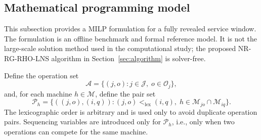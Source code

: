 \documentclass[a4paper,fleqn]{cas-sc}
\begin{document}
\subsection{Mathematical programming model}
\label{sec:milp}

This subsection provides a MILP formulation for a fully revealed service window. The formulation is an offline benchmark and formal reference model. It is not the large-scale solution method used in the computational study; the proposed NR-RG-RHO-LNS algorithm in Section~\ref{sec:algorithm} is solver-free.

Define the operation set
\begin{equation}
\mathcal A=\{(j,o):j\in\mathcal J,\;o\in\mathcal O_j\},
\label{eq:operation_set}
\end{equation}
and, for each machine \(h\in\mathcal M\), define the pair set
\begin{equation}
\mathcal P_h=
\{((j,o),(i,q)):(j,o)<_{\mathrm{lex}}(i,q),\;
h\in\mathcal M_{jo}\cap\mathcal M_{iq}\}.
\label{eq:pair_set}
\end{equation}
The lexicographic order is arbitrary and is used only to avoid duplicate operation pairs. Sequencing variables are introduced only for \(\mathcal P_h\), i.e., only when two operations can compete for the same machine.
\end{document}
